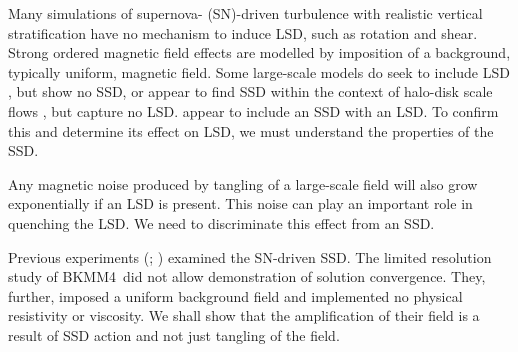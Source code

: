 \documentclass[preprint2]{aastex63}
\newcommand\BKM{{\sf BKMM4}}
\begin{document}
 Many simulations of supernova- (SN)-driven turbulence with realistic vertical
 stratification \citep[e.g.,][]{deAvillez:2005,PO07,Hill:2012a,HI14} have no
 mechanism to induce LSD, such as rotation and shear.
 Strong ordered magnetic field effects are modelled by
 imposition of a background, typically uniform, magnetic field.
 {Some large-scale models do seek to include LSD 
 \citep[e.g.,][]{Korpi:1999b,Gressel:2008,HWK09,WA09,Pakmor17,
 GE20}, but show no SSD, or appear to find SSD 
 within the context of halo-disk
 scale flows \citep[e.g.,][]{RT16,SBADMN19},  but capture no LSD.}
\citet[][with additional analysis by \citealt{EGSFB16}]{Gent:2013b}
 appear to include an {SSD with} {an} {LSD}.
 To confirm this and determine its effect on LSD, we must understand the
 properties of the SSD.
     
 Any magnetic noise produced by tangling {of a large-scale field}
 will also grow exponentially {if an LSD is} present.
 This noise {can play} an important role in quenching the LSD.
 We need to discriminate this effect from an SSD.   

 Previous experiments ({\citealp[e.g.,][hereafter \BKM]{BKMM04};
 \citealp{BalKim05,MacLow:2005}})
 examined the SN-driven SSD.
 {The limited  resolution} {study} of \BKM\ did not allow
 demonstration of {solution} convergence.
      They, further, imposed a uniform background field and
      implemented no physical resistivity or viscosity.
 We shall show that the amplification of their field is a result
 of SSD action and not just tangling of the field.
\end{document}

